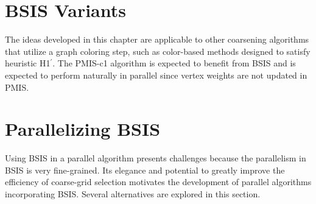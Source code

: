 \documentclass{elsart}
\begin{document}
\section{BSIS Variants}
The ideas developed in this chapter are applicable to other coarsening
algorithms that utilize a graph coloring step, such as color-based
methods designed to satisfy heuristic H1$^\prime$. The PMIS-c1
algorithm is expected to benefit from BSIS and is expected to perform
naturally in parallel since vertex weights are not updated in PMIS.

\section{Parallelizing BSIS}
Using BSIS in a parallel algorithm presents challenges because the
parallelism in BSIS is very fine-grained. Its elegance and potential
to greatly improve the efficiency of coarse-grid selection motivates
the development of parallel algorithms incorporating BSIS. Several
alternatives are explored in this section.
\end{document}
